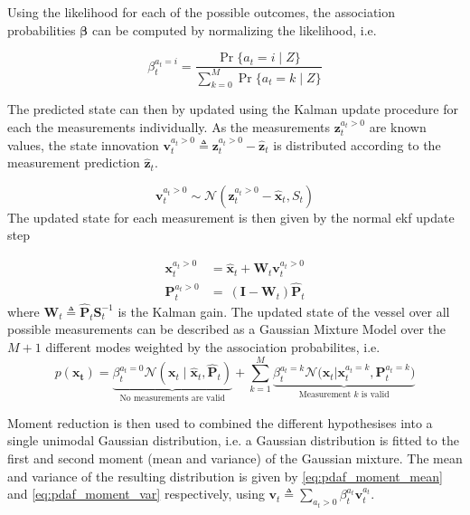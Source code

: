Using the likelihood for each of the possible outcomes, the association probabilities $\boldsymbol{\beta}$ can be computed by normalizing the likelihood, i.e.

\begin{equation}
    \beta_t^{a_t=i} = \frac{\Pr\{a_t=i \; | \; Z\}}{\sum_{k=0}^M \Pr\{a_t=k \; | \; Z\}}
\end{equation}

The predicted state can then by updated using the Kalman update procedure for each the measurements individually. As the measurements $\boldsymbol{z}_t^{a_t > 0}$ are known values, the state innovation $\boldsymbol{v}_t^{a_t>0} \triangleq \boldsymbol{z}_t^{a_t>0} - \hat{\boldsymbol{z}}_t$ is distributed according to the measurement prediction $\hat{\boldsymbol{z}}_t$.

\begin{equation}
    \boldsymbol{v}_t^{a_t>0} \sim \mathcal{N}(\boldsymbol{z}_t^{a_t>0} - \hat{\boldsymbol{x}}_t, S_t)
\end{equation}
The updated state for each measurement is then given by the normal \acrshort{ekf} update step

\begin{subequations}
    \begin{align}
        \boldsymbol{x}_t^{a_t > 0} & = \hat{\boldsymbol{x}}_t + \boldsymbol{W}_t \boldsymbol{v}_t^{a_t > 0} \\
        \boldsymbol{P}_t^{a_t > 0} & = \ (\boldsymbol{I} - \boldsymbol{W}_t) \hat{\boldsymbol{P}}_t
    \end{align}
\end{subequations}
where $\boldsymbol{W}_t \triangleq \hat{\boldsymbol{P}}_t \boldsymbol{S}_t^{-1}$ is the Kalman gain.
The updated state of the vessel over all possible measurements can be described as a Gaussian Mixture Model over the $M+1$ different modes weighted by the association probabilites, i.e.
\begin{equation}
    p(\boldsymbol{x_t}) = \underbrace{\beta_t^{a_t=0} \mathcal{N}(\boldsymbol{x}_t \; | \; \hat{\boldsymbol{x}}_t, \hat{\boldsymbol{P}}_t)}_{\text{No measurements are valid}} + \sum_{k=1}^M \underbrace{\beta_t^{a_t=k} \mathcal{N}\big(\boldsymbol{x}_t | \boldsymbol{x}_t^{a_t=k}, \boldsymbol{P}_t^{a_t=k}\big)}_{\text{Measurement $k$ is valid}}
\end{equation}


Moment reduction is then used to combined the different hypothesises into a single unimodal Gaussian distribution, i.e. a Gaussian distribution is fitted to the first and second moment (mean and variance) of the Gaussian mixture. The mean and variance of the resulting distribution is given by \cref{eq:pdaf_moment_mean} and \cref{eq:pdaf_moment_var} respectively, using $\boldsymbol{v}_t \triangleq \sum_{a_t > 0} \beta_t^{a_t} \boldsymbol{v}_t^{a_t}$.

